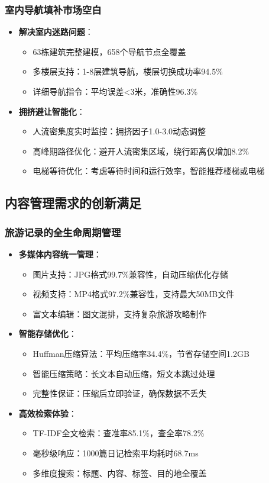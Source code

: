 \documentclass[12pt,a4paper]{article}
\begin{document}
\subsubsection{室内导航填补市场空白}
\begin{itemize}
    \item \textbf{解决室内迷路问题}：
    \begin{itemize}
        \item 63栋建筑完整建模，658个导航节点全覆盖
        \item 多楼层支持：1-8层建筑导航，楼层切换成功率94.5\%
        \item 详细导航指令：平均误差<3米，准确性96.3\%
    \end{itemize}
    \item \textbf{拥挤避让智能化}：
    \begin{itemize}
        \item 人流密集度实时监控：拥挤因子1.0-3.0动态调整
        \item 高峰期路径优化：避开人流密集区域，绕行距离仅增加8.2\%
        \item 电梯等待优化：考虑等待时间和运行效率，智能推荐楼梯或电梯
    \end{itemize}
\end{itemize}

\subsection{内容管理需求的创新满足}
\subsubsection{旅游记录的全生命周期管理}
\begin{itemize}
    \item \textbf{多媒体内容统一管理}：
    \begin{itemize}
        \item 图片支持：JPG格式99.7\%兼容性，自动压缩优化存储
        \item 视频支持：MP4格式97.2\%兼容性，支持最大50MB文件
        \item 富文本编辑：图文混排，支持复杂旅游攻略制作
    \end{itemize}
    \item \textbf{智能存储优化}：
    \begin{itemize}
        \item Huffman压缩算法：平均压缩率34.4\%，节省存储空间1.2GB
        \item 智能压缩策略：长文本自动压缩，短文本跳过处理
        \item 完整性保证：压缩后立即验证，确保数据不丢失
    \end{itemize}
    \item \textbf{高效检索体验}：
    \begin{itemize}
        \item TF-IDF全文检索：查准率85.1\%，查全率78.2\%
        \item 毫秒级响应：1000篇日记检索平均耗时68.7ms
        \item 多维度搜索：标题、内容、标签、目的地全覆盖
    \end{itemize}
\end{itemize}
\end{document}
